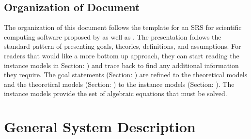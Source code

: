 \documentclass[12pt]{article}
\begin{document}

\subsection{Organization of Document}

The organization of this document follows the template for an SRS for scientific computing
software proposed by \cite{Koothoor2013} as well as \cite{SmithAndLai2005}. The presentation follows the standard pattern of presenting goals, theories, definitions, and assumptions. For readers
that would like a more bottom up approach, they can start reading the instance models in
Section:  ) and trace back to find any additional information they require.
The goal statements (Section:  ) are refined to the theoretical models
and the theoretical models (Section:  ) to the instance models (Section:  ). The instance models provide the set of algebraic equations that must be
solved.

\section{General System Description}
\end{document}
